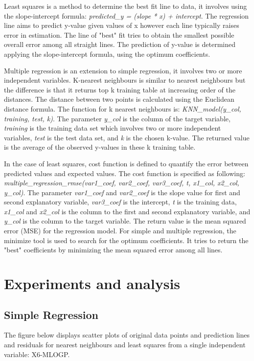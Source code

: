 \documentclass{ueacmpstyle}
\begin{document}
    Least squares is a method to determine the best fit line to data, it involves using the slope-intercept formula: \emph{predicted\_y = (slope * x) + intercept}. The regression line aims to predict y-value given values of x however each line typically raises error in estimation. The line of "best" fit tries to obtain the smallest possible overall error among all straight lines. The prediction of y-value is determined applying the slope-intercept formula, using the optimum coefficients.
    
    Multiple regression is an extension to simple regression, it involves two or more independent variables. K-nearest neighbours is similar to nearest neighbours but the difference is that it returns top k training table at increasing order of the distances. The distance between two points is calculated using the Euclidean distance formula. The function for k nearest neighbours is: \emph{KNN\_model(y\_col, training, test, k)}. The parameter \emph{y\_col} is the column of the target variable, \emph{training} is the training data set which involves two or more independent variables, \emph{test} is the test data set, and \emph{k} is the chosen k-value. The returned value is the average of the observed y-values in these k training table.
    
    In the case of least squares, cost function is defined to quantify the error between predicted values and expected values. The cost function is specified as following: \emph{multiple\_regression\_rmse(var1\_coef, var2\_coef, var3\_coef, t, x1\_col, x2\_col, y\_col)}. The parameter \emph{var1\_coef} and \emph{var2\_coef} is the slope value for first and second explanatory variable, \emph{var3\_coef} is the intercept, \emph{t} is the training data, \emph{x1\_col} and \emph{x2\_col} is the column to the first and second explanatory variable, and \emph{y\_col} is the column to the target variable. The return value is the mean squared error (MSE) for the regression model. For simple and multiple regression, the minimize tool is used to search for the optimum coefficients. It tries to return the "best" coefficients by minimizing the mean squared error among all lines. 
    
    \section{Experiments and analysis}\label{sec:experiment}	
    	
	    \subsection{Simple Regression}\label{sec:simpleRegression}
	    The figure below displays scatter plots of original data points and prediction lines and residuals for nearest neighbours and least squares from a single independent variable: X6-MLOGP. 
	    
\end{document}
